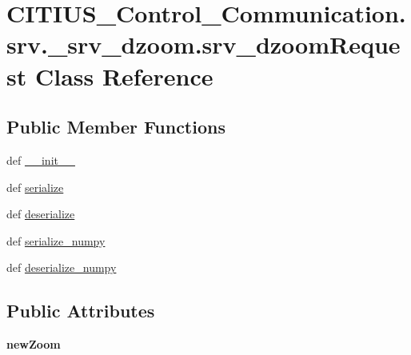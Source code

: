 \hypertarget{class_c_i_t_i_u_s___control___communication_1_1srv_1_1__srv__dzoom_1_1srv__dzoom_request}{\section{\-C\-I\-T\-I\-U\-S\-\_\-\-Control\-\_\-\-Communication.\-srv.\-\_\-srv\-\_\-dzoom.\-srv\-\_\-dzoom\-Request \-Class \-Reference}
\label{class_c_i_t_i_u_s___control___communication_1_1srv_1_1__srv__dzoom_1_1srv__dzoom_request}
}
\subsection*{\-Public \-Member \-Functions}
\begin{DoxyCompactItemize}
\item 
def \hyperlink{class_c_i_t_i_u_s___control___communication_1_1srv_1_1__srv__dzoom_1_1srv__dzoom_request_a8528ec4310957f32313a88ca1c2791ec}{\-\_\-\-\_\-init\-\_\-\-\_\-}
\item 
def \hyperlink{class_c_i_t_i_u_s___control___communication_1_1srv_1_1__srv__dzoom_1_1srv__dzoom_request_a176ccc6bd80eb7fbc3d8992189fe9da5}{serialize}
\item 
def \hyperlink{class_c_i_t_i_u_s___control___communication_1_1srv_1_1__srv__dzoom_1_1srv__dzoom_request_af7460c89bd3c54cdf5d408772a192f47}{deserialize}
\item 
def \hyperlink{class_c_i_t_i_u_s___control___communication_1_1srv_1_1__srv__dzoom_1_1srv__dzoom_request_a3ea4783a48ed32a1ba200c226d3a0a39}{serialize\-\_\-numpy}
\item 
def \hyperlink{class_c_i_t_i_u_s___control___communication_1_1srv_1_1__srv__dzoom_1_1srv__dzoom_request_afc0e1e5c1298b52ec350082e2e159cdf}{deserialize\-\_\-numpy}
\end{DoxyCompactItemize}
\subsection*{\-Public \-Attributes}
\begin{DoxyCompactItemize}
\item 
\hypertarget{class_c_i_t_i_u_s___control___communication_1_1srv_1_1__srv__dzoom_1_1srv__dzoom_request_ac956f126daa1ab1f1c93be3b920d0eb1}{{\bfseries new\-Zoom}}\label{class_c_i_t_i_u_s___control___communication_1_1srv_1_1__srv__dzoom_1_1srv__dzoom_request_ac956f126daa1ab1f1c93be3b920d0eb1}

\end{DoxyCompactItemize}

